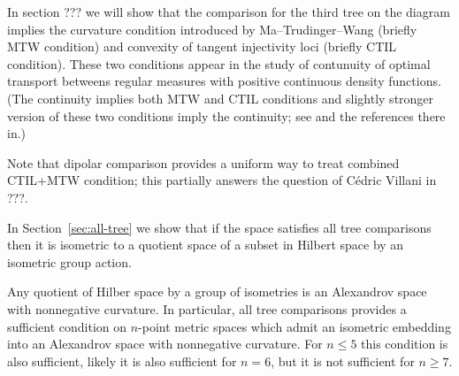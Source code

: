 In section ??? we will show that the comparison for the third tree on the diagram implies
the curvature condition introduced by Ma--Trudinger--Wang (briefly MTW condition) and convexity of tangent injectivity loci (briefly CTIL condition).
These two conditions appear in the study of contunuity of optimal transport betweens regular measures with positive continuous density functions.
(The continuity implies both MTW and CTIL conditions and slightly stronger version of these two conditions imply the continuity;
see \cite{FRV-Nec+Suf} \cite{MTW+CTIL} and the references there in.)

Note that dipolar comparison provides a uniform way to treat combined CTIL+MTW condition;
this partially answers the question of Cédric Villani in ???.

In Section~\ref{sec:all-tree} we show that if the space satisfies all tree comparisons then it is isometric to a quotient space of a subset in Hilbert space by an isometric group action.

Any quotient of Hilber space by a group of isometries is an Alexandrov space with nonnegative curvature.
In particular, all tree comparisons provides a sufficient condition on $n$-point metric spaces which admit an isometric embedding into an Alexandrov space with nonnegative curvature.
For $n\le 5$ this condition is also sufficient, likely it is also sufficient for $n=6$, but it is not sufficient for $n\ge 7$.
